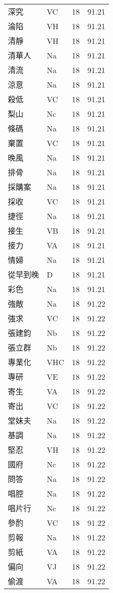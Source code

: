 \documentclass[twocolumn]{book}
\begin{document}
\begin{supertabular}{llrr}
深究 & VC & 18 &  91.21\\
淪陷 & VH & 18 &  91.21\\
清靜 & VH & 18 &  91.21\\
清華人 & Na & 18 &  91.21\\
清流 & Na & 18 &  91.21\\
涼意 & Na & 18 &  91.21\\
殺低 & VC & 18 &  91.21\\
梨山 & Nc & 18 &  91.21\\
條碼 & Na & 18 &  91.21\\
棄置 & VC & 18 &  91.21\\
晚風 & Na & 18 &  91.21\\
排骨 & Na & 18 &  91.21\\
採購案 & Na & 18 &  91.21\\
採收 & VC & 18 &  91.21\\
捷徑 & Na & 18 &  91.21\\
接生 & VB & 18 &  91.21\\
接力 & VA & 18 &  91.21\\
情婦 & Na & 18 &  91.21\\
從早到晚 & D & 18 &  91.21\\
彩色 & Na & 18 &  91.21\\
強敵 & Na & 18 &  91.22\\
強求 & VC & 18 &  91.22\\
張建鈞 & Nb & 18 &  91.22\\
張立群 & Nb & 18 &  91.22\\
專業化 & VHC & 18 &  91.22\\
專研 & VE & 18 &  91.22\\
寄生 & VA & 18 &  91.22\\
寄出 & VC & 18 &  91.22\\
堂妹夫 & Na & 18 &  91.22\\
基調 & Na & 18 &  91.22\\
堅忍 & VH & 18 &  91.22\\
國府 & Nc & 18 &  91.22\\
問答 & Na & 18 &  91.22\\
唱腔 & Na & 18 &  91.22\\
唱片行 & Nc & 18 &  91.22\\
參酌 & VC & 18 &  91.22\\
剪報 & Na & 18 &  91.22\\
剪紙 & VA & 18 &  91.22\\
偏向 & VJ & 18 &  91.22\\
偷渡 & VA & 18 &  91.22\\

\end{supertabular}
\end{document}
